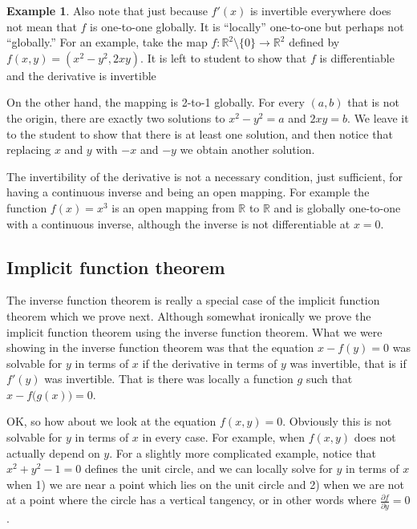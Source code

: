 \documentclass[12pt]{book}
\newcommand{\R}{{\mathbb{R}}}
\theoremstyle{plain}
\theoremstyle{remark}
\theoremstyle{definition}
\theoremstyle{exercise}
\theoremstyle{example}
\newtheorem{example}[thm]{Example}
\begin{document}
\begin{example}
Also note that just because $f'(x)$ is invertible everywhere does not
mean that $f$ is
one-to-one globally.  It is ``locally'' one-to-one but perhaps not
``globally.''  For an
example, take the map $f \colon \R^2 \setminus \{ 0 \} \to \R^2$ defined
by $f(x,y) = (x^2-y^2,2xy)$.
It is left to student to show that $f$ is
differentiable and the derivative is invertible

On the other hand, the mapping is 2-to-1 globally.  For every
$(a,b)$ that is not the origin, there are exactly two
solutions to $x^2-y^2=a$ and $2xy=b$.  We leave it to the student
to show that there is at least one solution, and then notice
that replacing $x$ and $y$ with $-x$ and $-y$ we obtain another solution.
\end{example}

The invertibility of the derivative is not a necessary
condition, just sufficient, for having a continuous inverse and being an open
mapping.  For example the function $f(x) = x^3$ is an open mapping from $\R$
to $\R$ and is globally one-to-one with a continuous inverse, although the
inverse is not differentiable at $x=0$.

\subsection{Implicit function theorem}

The inverse function theorem is really a special case of the implicit
function theorem which we prove next.  Although somewhat ironically we 
prove the implicit function theorem using the inverse function theorem.
What we were showing in the inverse function theorem was that
the equation $x-f(y) = 0$ was solvable for $y$ in terms of $x$ if the derivative
in terms of $y$ was invertible, that is if $f'(y)$ was invertible.
That is there was locally a
function $g$ such that $x-f\bigl(g(x)\bigr) = 0$.

OK, so how about we look at the equation $f(x,y) = 0$.  Obviously this is
not solvable for $y$ in terms of $x$ in every case.  For example,
when $f(x,y)$ does not actually depend on $y$.  For a slightly more
complicated example, notice that $x^2+y^2-1 = 0$ defines the unit circle, and
we can locally solve for $y$ in terms of $x$ when 1) we are near
a point which lies on the unit circle and 2) when we are not at a point
where the circle has a vertical tangency, or in other words where
$\frac{\partial f}{\partial y} = 0$.
\end{document}
